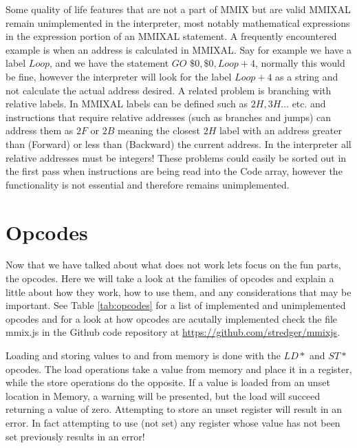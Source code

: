 \documentclass[conference]{IEEEtran}
\begin{document}
Some quality of life features that are not a part of MMIX but are valid MMIXAL remain unimplemented in the interpreter, most notably mathematical expressions in the expression portion of an MMIXAL statement. A frequently encountered example is when an address is calculated in MMIXAL. Say for example we have a label $Loop$, and we have the statement $GO$ $\$0,\$0,Loop+4$, normally this would be fine, however the interpreter will look for the label $Loop+4$ as a string and not calculate the actual address desired. A related problem is branching with relative labels. In MMIXAL labels can be defined such as $2H, 3H \dots $ etc. and instructions that require relative addresses (such as branches and jumps) can address them as $2F$ or $2B$ meaning the closest $2H$ label with an address greater than (Forward) or less than (Backward) the current address. In the interpreter all relative addresses must be integers! These problems could easily be sorted out in the first pass when instructions are being read into the Code array, however the functionality is not essential and therefore remains unimplemented.

\vspace{0.5cm}
\section{Opcodes}
\label{sec:ops}

Now that we have talked about what does not work lets focus on the fun parts, the opcodes. Here we will take a look at the families of opcodes and explain a little about how they work, how to use them, and any considerations that may be important. See Table \ref{tab:opcodes} for a list of implemented and unimplemented opcodes and for a look at how opcodes are acutally implemented check the file mmix.js in the Github code repository at \url{https://github.com/stredger/mmixjs}.

Loading and storing values to and from memory is done with the $LD*$ and $ST*$ opcodes. The load operations take a value from memory and place it in a register, while the store operations do the opposite. If a value is loaded from an unset location in Memory, a warning will be presented, but the load will succeed returning a value of zero. Attempting to store an unset register will result in an error. In fact attempting to use (not set) any register whose value has not been set previously results in an error!
\end{document}
